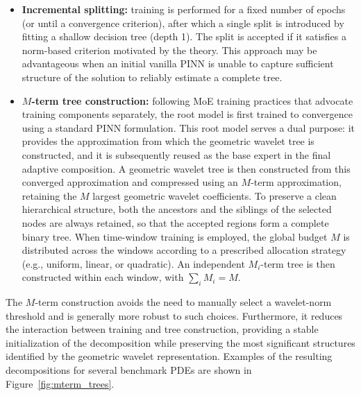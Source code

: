 \begin{itemize}
\\
    \item \textbf{Incremental splitting:} training is performed for a fixed number
    of epochs (or until a convergence criterion), after which a single split is
    introduced by fitting a shallow decision tree (depth 1). The split is accepted
    if it satisfies a norm-based criterion motivated by the theory. This approach may be advantageous when an initial vanilla PINN is unable to
    capture sufficient structure of the solution to reliably estimate a complete
    tree.

    \item \textbf{$M$-term tree construction:} following MoE
training practices that advocate training components
separately, the root model is first
trained to convergence using a standard PINN formulation. This root model
serves a dual purpose: it provides the approximation from which the geometric
wavelet tree is constructed, and it is subsequently reused as the base expert
in the final adaptive composition. A geometric wavelet tree is then
constructed from this converged approximation and compressed using an $M$-term
approximation, retaining the $M$ largest geometric wavelet coefficients.
To preserve a clean hierarchical structure, both the ancestors and the
siblings of the selected nodes are always retained, so that the accepted
regions form a complete binary tree.
When time-window training is employed, the global budget $M$ is distributed across the windows according to a prescribed allocation strategy (e.g., uniform, linear, or quadratic). An independent $M_i$-term tree is then constructed within each window, with $\sum_i M_i = M$.
\end{itemize}

\noindent The $M$-term construction avoids the need to manually select a wavelet-norm
threshold and is generally more robust to such choices. Furthermore, it
reduces the interaction between training and tree construction, providing a
stable initialization of the decomposition while preserving the most
significant structures identified by the geometric wavelet representation. Examples of the
resulting decompositions for several benchmark PDEs are shown in
Figure~\ref{fig:mterm_trees}.

\vspace{0.5em}

